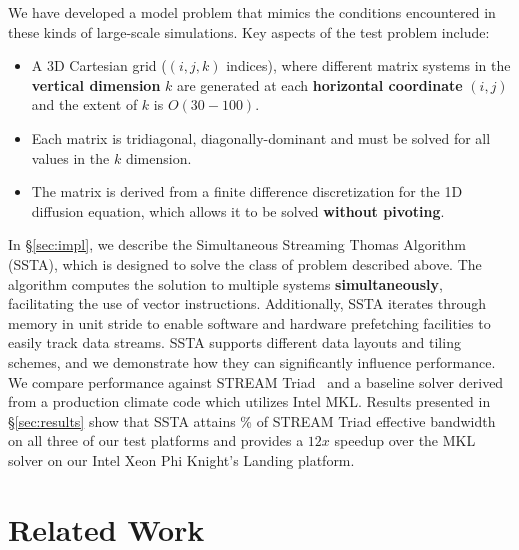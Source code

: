 \documentclass[10pt, conference, compsocconf]{IEEEtran}
\newcommand{\textapprox}{\texttildelow}
\begin{document}
We have developed a model problem that mimics the conditions encountered in
  these kinds of large-scale simulations. 
Key aspects of the test problem include:
\begin{itemize}
\item A 3D Cartesian grid (\((i,j,k)\) indices), where different matrix
  systems in the \textbf{vertical dimension} \(k\) are generated at each
  \textbf{horizontal coordinate} \((i,j)\) and the extent of \(k\) is
  \(O(30-100)\).
\item Each matrix is tridiagonal, diagonally-dominant and must be solved for
  all values in the \(k\) dimension.
\item The matrix is derived from a finite difference discretization for the
  1D diffusion equation, which allows it to be solved \textbf{without pivoting}.
\end{itemize}

In \S\ref{sec:impl}, we describe the Simultaneous Streaming Thomas
  Algorithm (SSTA), which is designed to solve the class of problem described
  above.
The algorithm computes the solution to multiple systems \textbf{simultaneously},
  facilitating the use of vector instructions.
Additionally, SSTA iterates through memory in unit stride to enable software and 
  hardware prefetching facilities to easily track data streams.
SSTA supports different data layouts and tiling schemes, and we demonstrate how
  they can significantly influence performance.
We compare performance against STREAM Triad~\cite{stream} and a baseline solver
  derived from a production climate code which utilizes Intel MKL.
Results presented in \S\ref{sec:results} show that SSTA attains \textapprox 90\%
  of STREAM Triad effective bandwidth on all three of our test platforms and
  provides a \textapprox \(12x\) speedup over the MKL solver on our Intel Xeon
  Phi Knight's Landing platform.

\section{Related Work}
\label{sec:related}
\end{document}
